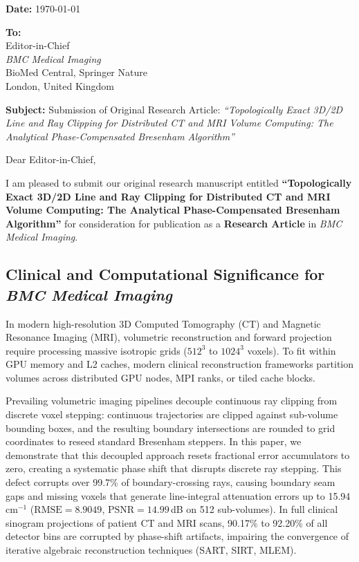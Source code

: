 \documentclass[11pt]{article}
\begin{document}
\noindent \textbf{Date:} \today

\vspace{0.3cm}
\noindent \textbf{To:}\\
Editor-in-Chief\\
\textit{BMC Medical Imaging}\\
BioMed Central, Springer Nature\\
London, United Kingdom

\vspace{0.4cm}
\noindent \textbf{Subject:} Submission of Original Research Article: \textit{``Topologically Exact 3D/2D Line and Ray Clipping for Distributed CT and MRI Volume Computing: The Analytical Phase-Compensated Bresenham Algorithm''}

\vspace{0.4cm}
\noindent Dear Editor-in-Chief,

\vspace{0.2cm}
I am pleased to submit our original research manuscript entitled \textbf{``Topologically Exact 3D/2D Line and Ray Clipping for Distributed CT and MRI Volume Computing: The Analytical Phase-Compensated Bresenham Algorithm''} for consideration for publication as a \textbf{Research Article} in \textit{BMC Medical Imaging}.

\subsection*{Clinical and Computational Significance for \textit{BMC Medical Imaging}}
In modern high-resolution 3D Computed Tomography (CT) and Magnetic Resonance Imaging (MRI), volumetric reconstruction and forward projection require processing massive isotropic grids ($512^3$ to $1024^3$ voxels). To fit within GPU memory and L2 caches, modern clinical reconstruction frameworks partition volumes across distributed GPU nodes, MPI ranks, or tiled cache blocks. 

Prevailing volumetric imaging pipelines decouple continuous ray clipping from discrete voxel stepping: continuous trajectories are clipped against sub-volume bounding boxes, and the resulting boundary intersections are rounded to grid coordinates to reseed standard Bresenham steppers. In this paper, we demonstrate that this decoupled approach resets fractional error accumulators to zero, creating a systematic phase shift that disrupts discrete ray stepping. This defect corrupts over 99.7\% of boundary-crossing rays, causing boundary seam gaps and missing voxels that generate line-integral attenuation errors up to 15.94\,cm$^{-1}$ ($\mathrm{RMSE} = 8.9049$, $\mathrm{PSNR} = 14.99$\,dB on 512 sub-volumes). In full clinical sinogram projections of patient CT and MRI scans, 90.17\% to 92.20\% of all detector bins are corrupted by phase-shift artifacts, impairing the convergence of iterative algebraic reconstruction techniques (SART, SIRT, MLEM).
\end{document}
